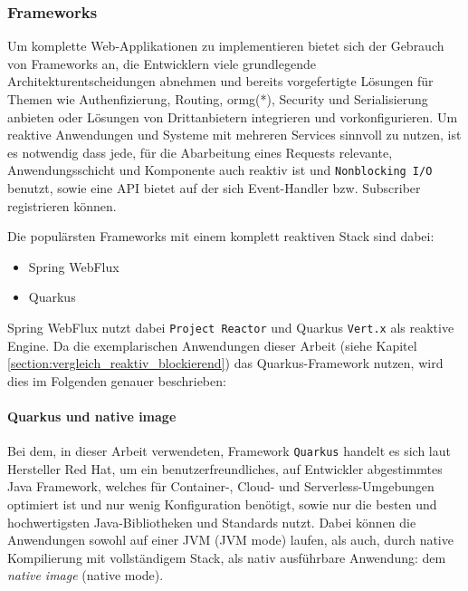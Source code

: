 \subsubsection{Frameworks}
\label{subsubsec:frameworks}
Um komplette Web-Applikationen zu implementieren bietet sich der Gebrauch von Frameworks an, die Entwicklern viele grundlegende Architekturentscheidungen
abnehmen und bereits vorgefertigte Lösungen für Themen wie Authenfizierung, Routing, \Gls{ormg}(*), Security und Serialisierung anbieten oder
Lösungen von Drittanbietern integrieren und vorkonfigurieren.
Um reaktive Anwendungen und Systeme mit mehreren Services sinnvoll zu nutzen, ist es notwendig dass jede, für die Abarbeitung eines Requests relevante,
Anwendungsschicht und Komponente auch reaktiv ist und \verb|Nonblocking I/O| benutzt, sowie eine API bietet auf der
sich Event-Handler bzw. Subscriber registrieren können.

Die populärsten Frameworks mit einem komplett reaktiven Stack sind dabei:

\begin{itemize}
  \item Spring WebFlux
  \item Quarkus
\end{itemize}

Spring WebFlux nutzt dabei \verb|Project Reactor| und Quarkus \verb|Vert.x| als reaktive Engine. \parencite{QuarkusReactiveGettingStarted}
Da die exemplarischen Anwendungen dieser Arbeit (siehe Kapitel \ref{section:vergleich_reaktiv_blockierend}) das Quarkus-Framework nutzen, wird dies
im Folgenden genauer beschrieben:
\paragraph{Quarkus und native image}

Bei dem, in dieser Arbeit verwendeten, Framework \verb|Quarkus| handelt es sich laut Hersteller Red Hat, um ein
benutzerfreundliches, auf Entwickler abgestimmtes Java Framework, welches für Container-, Cloud- und Serverless-Umgebungen optimiert ist und nur wenig
Konfiguration benötigt, sowie nur die besten und hochwertigsten Java-Bibliotheken und Standards nutzt.
Dabei können die Anwendungen sowohl auf einer JVM (JVM mode) laufen, als auch, durch native Kompilierung mit vollständigem Stack,
als nativ ausführbare Anwendung: dem \textit{native image} (native mode).

